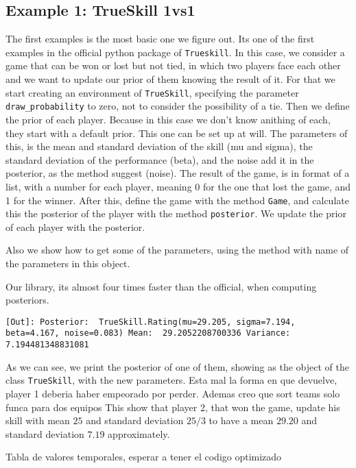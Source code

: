 \documentclass[article]{jss}
\begin{document}
\subsection{Example 1: TrueSkill 1vs1}
The first examples is the most basic one we figure out. Its one of the first examples in the official python package of \texttt{Trueskill}.
In this case, we consider a game that can be won or lost but not tied, in which two players face each other and we want to update our prior of them knowing the result of it.
For that we start creating an environment of \texttt{TrueSkill}, specifying the parameter \texttt{draw\_probability} to zero, not to consider the possibility of a tie.
Then we define the prior of each player. 
Because in this case we don't know anithing of each, they start with a default prior.
This one can be set up at will.
The parameters of this, is the mean and standard deviation of the skill (mu and sigma), the standard deviation of the performance (beta), and the noise add it in the posterior, as the method suggest (noise).
The result of the game, is in format of a list, with a number for each player, meaning 0 for the one that lost the game, and 1 for the winner.
After this, define the game with the method \texttt{Game}, and calculate this the posterior of the player with the method \texttt{posterior}.
We update the prior of each player with the posterior.

Also we show how to get some of the parameters, using the method with name of the parameters in this object.

Our library, its almost four times faster than the official, when computing posteriors.

\begin{lstlisting}
[Out]: Posterior:  TrueSkill.Rating(mu=29.205, sigma=7.194, beta=4.167, noise=0.083) Mean:  29.2052208700336 Variance:  7.194481348831081
\end{lstlisting}

As we can see, we print the posterior of one of them, showing as the object of the class \texttt{TrueSkill}, with the new parameters.
Esta mal la forma en que devuelve, player 1 deberia haber empeorado por perder. Ademas creo que sort teams solo funca para dos equipos
This show that player 2, that won the game, update his skill with mean $25$ and standard deviation $25/3$ to have a mean $29.20$ and standard deviation $7.19$ approximately.

Tabla de valores temporales, esperar a tener el codigo optimizado 
\end{document}
